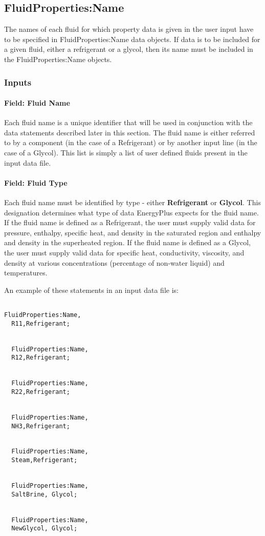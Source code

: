 \subsection{FluidProperties:Name}\label{fluidpropertiesname}

The names of each fluid for which property data is given in the user input have to be specified in FluidProperties:Name data objects. If data is to be included for a given fluid, either a refrigerant or a glycol, then its name must be included in the FluidProperties:Name objects.

\subsubsection{Inputs}\label{inputs-020}

\paragraph{Field: Fluid Name}\label{field-fluid-name}

Each fluid name is a unique identifier that will be used in conjunction with the data statements described later in this section. The fluid name is either referred to by a component (in the case of a Refrigerant) or by another input line (in the case of a Glycol). This list is simply a list of user defined fluids present in the input data file.

\paragraph{Field: Fluid Type}\label{field-fluid-type}

Each fluid name must be identified by type - either \textbf{Refrigerant} or \textbf{Glycol}. This designation determines what type of data EnergyPlus expects for the fluid name. If the fluid name is defined as a Refrigerant, the user must supply valid data for pressure, enthalpy, specific heat, and density in the saturated region and enthalpy and density in the superheated region. If the fluid name is defined as a Glycol, the user must supply valid data for specific heat, conductivity, viscosity, and density at various concentrations (percentage of non-water liquid) and temperatures.

An example of these statements in an input data file is:

\begin{lstlisting}

FluidProperties:Name,
  R11,Refrigerant;


  FluidProperties:Name,
  R12,Refrigerant;


  FluidProperties:Name,
  R22,Refrigerant;


  FluidProperties:Name,
  NH3,Refrigerant;


  FluidProperties:Name,
  Steam,Refrigerant;


  FluidProperties:Name,
  SaltBrine, Glycol;


  FluidProperties:Name,
  NewGlycol, Glycol;
\end{lstlisting}

